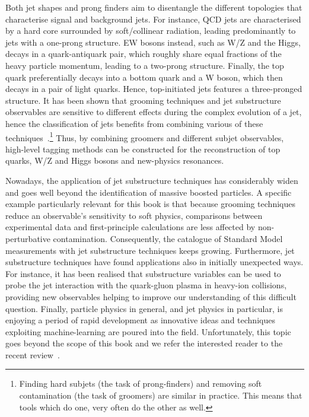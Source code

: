Both jet shapes and prong finders aim to disentangle the different
topologies that characterise signal and background jets. For instance,
QCD jets are characterised by a hard core surrounded by soft/collinear
radiation, leading predominantly to jets with a one-prong
structure. EW bosons instead, such as W/Z and the Higgs, decays in a
quark-antiquark pair, which roughly share equal fractions of the heavy
particle momentum, leading to a two-prong structure. Finally, the top
quark preferentially decays into a bottom quark and a W boson, which
then decays in a pair of light quarks. Hence, top-initiated jets
features a three-pronged structure.
%
It has been shown that grooming techniques and jet substructure
observables are sensitive to different effects during the complex
evolution of a jet, hence the classification of jets benefits
from combining various of these techniques~\cite{Soper:2010xk,
  Adams:2015hiv}.\footnote{Finding hard subjets (the task of
  prong-finders) and removing soft contamination (the task of
  groomers) are similar in practice. This means that tools which do
  one, very often do the other as well.} Thus, by combining groomers
and different subjet observables, high-level tagging methods can be
constructed for the reconstruction of top quarks, W/Z and Higgs bosons
and new-physics resonances.

Nowadays, the application of jet substructure techniques has
considerably widen and goes well beyond the identification of massive
boosted particles.  A specific example particularly relevant for this
book is that because grooming techniques reduce an observable's
sensitivity to soft physics, comparisons between experimental data and
first-principle calculations are less affected by non-perturbative
contamination. Consequently, the catalogue of Standard Model
measurements with jet substructure techniques keeps
growing. Furthermore, jet substructure techniques have found
applications also in initially unexpected ways. For instance, it has
been realised that substructure variables can be used to probe the jet
interaction with the quark-gluon plasma in heavy-ion collisions,
providing new observables helping to improve our understanding of this
difficult question. Finally, particle physics in general, and jet
physics in particular, is enjoying a period of rapid development as
innovative ideas and techniques exploiting machine-learning are poured
into the field. Unfortunately, this topic goes beyond the scope of
this book and we refer the interested reader to the recent
review~\cite{Larkoski:2017jix}.

